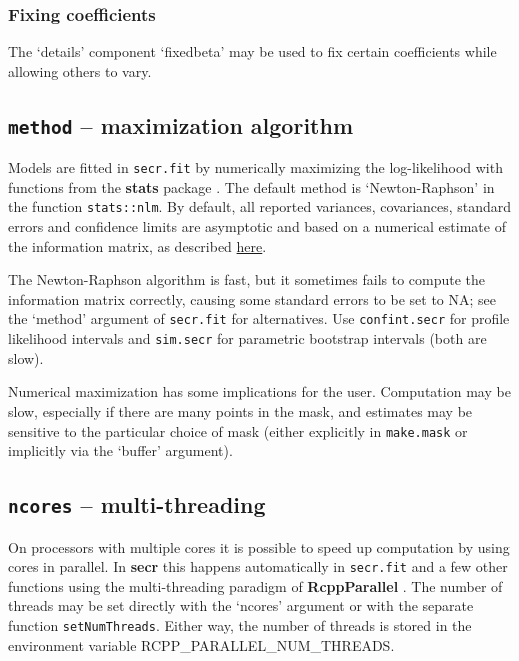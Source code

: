 \documentclass[
]{book}
\begin{document}
\subsubsection{Fixing coefficients}\label{fixing-coefficients}

The `details' component `fixedbeta' may be used to fix certain coefficients while allowing others to vary.

\subsection{\texorpdfstring{\texttt{method} -- maximization algorithm}{method -- maximization algorithm}}\label{method-maximization-algorithm}


Models are fitted in \texttt{secr.fit} by numerically maximizing the log-likelihood with functions from the \textbf{stats} package \citep{R-base}. The default method is `Newton-Raphson' in the function \texttt{stats::nlm}. By default, all reported variances, covariances, standard errors and confidence limits are asymptotic and based on a numerical estimate of the information matrix, as described \hyperref[confidenceintervals]{here}.

The Newton-Raphson algorithm is fast, but it sometimes fails to compute the information matrix correctly, causing some standard errors to be set to NA; see the `method' argument of \texttt{secr.fit} for alternatives. Use \texttt{confint.secr} for profile likelihood intervals and \texttt{sim.secr} for parametric bootstrap intervals (both are slow).

Numerical maximization has some implications for the user. Computation may be slow, especially if there are many points in the mask, and estimates may be sensitive to the particular choice of mask (either explicitly in \texttt{make.mask} or implicitly via the `buffer' argument).

\subsection{\texorpdfstring{\texttt{ncores} -- multi-threading}{ncores -- multi-threading}}\label{ncores-multi-threading}


On processors with multiple cores it is possible to speed up computation by using cores in parallel. In \textbf{secr} this happens automatically in \texttt{secr.fit} and a few other functions using the multi-threading paradigm of \textbf{RcppParallel} \citep{R-RcppParallel}. The number of threads may be set directly with the `ncores' argument or with the separate function \texttt{setNumThreads}. Either way, the number of threads is stored in the environment variable RCPP\_PARALLEL\_NUM\_THREADS.
\end{document}
